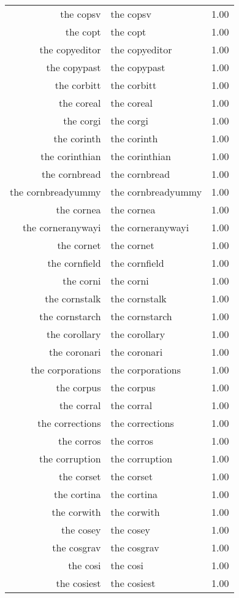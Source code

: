 \begin{table}[ht]
\begin{tabular}{rlr}
  the copsv & the copsv & 1.00 \\ 
  the copt & the copt & 1.00 \\ 
  the copyeditor & the copyeditor & 1.00 \\ 
  the copypast & the copypast & 1.00 \\ 
  the corbitt & the corbitt & 1.00 \\ 
  the coreal & the coreal & 1.00 \\ 
  the corgi & the corgi & 1.00 \\ 
  the corinth & the corinth & 1.00 \\ 
  the corinthian & the corinthian & 1.00 \\ 
  the cornbread & the cornbread & 1.00 \\ 
  the cornbreadyummy & the cornbreadyummy & 1.00 \\ 
  the cornea & the cornea & 1.00 \\ 
  the corneranywayi & the corneranywayi & 1.00 \\ 
  the cornet & the cornet & 1.00 \\ 
  the cornfield & the cornfield & 1.00 \\ 
  the corni & the corni & 1.00 \\ 
  the cornstalk & the cornstalk & 1.00 \\ 
  the cornstarch & the cornstarch & 1.00 \\ 
  the corollary & the corollary & 1.00 \\ 
  the coronari & the coronari & 1.00 \\ 
  the corporations & the corporations & 1.00 \\ 
  the corpus & the corpus & 1.00 \\ 
  the corral & the corral & 1.00 \\ 
  the corrections & the corrections & 1.00 \\ 
  the corros & the corros & 1.00 \\ 
  the corruption & the corruption & 1.00 \\ 
  the corset & the corset & 1.00 \\ 
  the cortina & the cortina & 1.00 \\ 
  the corwith & the corwith & 1.00 \\ 
  the cosey & the cosey & 1.00 \\ 
  the cosgrav & the cosgrav & 1.00 \\ 
  the cosi & the cosi & 1.00 \\ 
  the cosiest & the cosiest & 1.00 \\ 

\end{tabular}
\end{table}
